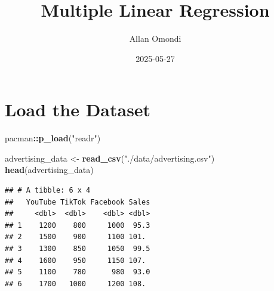 \documentclass[
]{article}
\title{Multiple Linear Regression}
\author{Allan Omondi}
\date{2025-05-27}
\newenvironment{Shaded}{\begin{snugshade}}{\end{snugshade}}
\newcommand{\AttributeTok}[1]{\textcolor[rgb]{0.13,0.29,0.53}{#1}}
\newcommand{\ConstantTok}[1]{\textcolor[rgb]{0.56,0.35,0.01}{#1}}
\newcommand{\ControlFlowTok}[1]{\textcolor[rgb]{0.13,0.29,0.53}{\textbf{#1}}}
\newcommand{\FunctionTok}[1]{\textcolor[rgb]{0.13,0.29,0.53}{\textbf{#1}}}
\newcommand{\NormalTok}[1]{#1}
\newcommand{\OtherTok}[1]{\textcolor[rgb]{0.56,0.35,0.01}{#1}}
\newcommand{\SpecialCharTok}[1]{\textcolor[rgb]{0.81,0.36,0.00}{\textbf{#1}}}
\newcommand{\StringTok}[1]{\textcolor[rgb]{0.31,0.60,0.02}{#1}}
\begin{document}
\maketitle

{
\setcounter{tocdepth}{4}
\tableofcontents
}
\begin{Shaded}
\end{Shaded}

\section{Load the Dataset}\label{load-the-dataset}

\begin{Shaded}
\begin{Highlighting}[]
\NormalTok{pacman}\SpecialCharTok{::}\FunctionTok{p\_load}\NormalTok{(}\StringTok{"readr"}\NormalTok{)}

\NormalTok{advertising\_data }\OtherTok{\textless{}{-}} \FunctionTok{read\_csv}\NormalTok{(}\StringTok{"./data/advertising.csv"}\NormalTok{)}
\FunctionTok{head}\NormalTok{(advertising\_data)}
\end{Highlighting}
\end{Shaded}

\begin{verbatim}
## # A tibble: 6 x 4
##   YouTube TikTok Facebook Sales
##     <dbl>  <dbl>    <dbl> <dbl>
## 1    1200    800     1000  95.3
## 2    1500    900     1100 101. 
## 3    1300    850     1050  99.5
## 4    1600    950     1150 107. 
## 5    1100    780      980  93.0
## 6    1700   1000     1200 108.
\end{verbatim}
\end{document}
